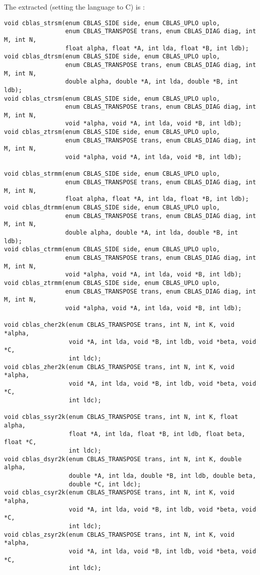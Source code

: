 The extracted (setting the language to C) is :
\begin{verbatim}
void cblas_strsm(enum CBLAS_SIDE side, enum CBLAS_UPLO uplo,
                 enum CBLAS_TRANSPOSE trans, enum CBLAS_DIAG diag, int M, int N,
                 float alpha, float *A, int lda, float *B, int ldb);
void cblas_dtrsm(enum CBLAS_SIDE side, enum CBLAS_UPLO uplo,
                 enum CBLAS_TRANSPOSE trans, enum CBLAS_DIAG diag, int M, int N,
                 double alpha, double *A, int lda, double *B, int ldb);
void cblas_ctrsm(enum CBLAS_SIDE side, enum CBLAS_UPLO uplo,
                 enum CBLAS_TRANSPOSE trans, enum CBLAS_DIAG diag, int M, int N,
                 void *alpha, void *A, int lda, void *B, int ldb);
void cblas_ztrsm(enum CBLAS_SIDE side, enum CBLAS_UPLO uplo,
                 enum CBLAS_TRANSPOSE trans, enum CBLAS_DIAG diag, int M, int N,
                 void *alpha, void *A, int lda, void *B, int ldb);

void cblas_strmm(enum CBLAS_SIDE side, enum CBLAS_UPLO uplo,
                 enum CBLAS_TRANSPOSE trans, enum CBLAS_DIAG diag, int M, int N,
                 float alpha, float *A, int lda, float *B, int ldb);
void cblas_dtrmm(enum CBLAS_SIDE side, enum CBLAS_UPLO uplo,
                 enum CBLAS_TRANSPOSE trans, enum CBLAS_DIAG diag, int M, int N,
                 double alpha, double *A, int lda, double *B, int ldb);
void cblas_ctrmm(enum CBLAS_SIDE side, enum CBLAS_UPLO uplo,
                 enum CBLAS_TRANSPOSE trans, enum CBLAS_DIAG diag, int M, int N,
                 void *alpha, void *A, int lda, void *B, int ldb);
void cblas_ztrmm(enum CBLAS_SIDE side, enum CBLAS_UPLO uplo,
                 enum CBLAS_TRANSPOSE trans, enum CBLAS_DIAG diag, int M, int N,
                 void *alpha, void *A, int lda, void *B, int ldb);

void cblas_cher2k(enum CBLAS_TRANSPOSE trans, int N, int K, void *alpha,
                  void *A, int lda, void *B, int ldb, void *beta, void *C,
                  int ldc);
void cblas_zher2k(enum CBLAS_TRANSPOSE trans, int N, int K, void *alpha,
                  void *A, int lda, void *B, int ldb, void *beta, void *C,
                  int ldc);

void cblas_ssyr2k(enum CBLAS_TRANSPOSE trans, int N, int K, float alpha,
                  float *A, int lda, float *B, int ldb, float beta, float *C,
                  int ldc);
void cblas_dsyr2k(enum CBLAS_TRANSPOSE trans, int N, int K, double alpha,
                  double *A, int lda, double *B, int ldb, double beta,
                  double *C, int ldc);
void cblas_csyr2k(enum CBLAS_TRANSPOSE trans, int N, int K, void *alpha,
                  void *A, int lda, void *B, int ldb, void *beta, void *C,
                  int ldc);
void cblas_zsyr2k(enum CBLAS_TRANSPOSE trans, int N, int K, void *alpha,
                  void *A, int lda, void *B, int ldb, void *beta, void *C,
                  int ldc);


\end{verbatim}
